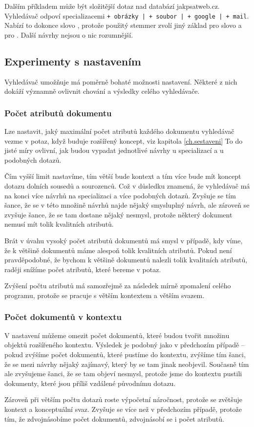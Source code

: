 \documentclass[12pt]{article}
\newcommand{\code}[1]{\texttt{#1}}
\newcommand{\ssection}[1]{\subsection{#1}}
\newcommand{\sssection}[1]{\subsubsection{#1}}
\begin{document}
Dalším příkladem může být složitější dotaz  nad databází jakpsatweb.cz. Vyhledávač odpoví specializacemi \code{+ obrázky | + soubor | + google | + mail}. Nabízí to dokonce slovo , protože použitý stemmer zvolí jiný základ pro slovo  a pro . Další návrhy nejsou o nic rozumnější. 


\ssection{Experimenty s nastavením}
Vyhledávač umožňuje má poměrně bohaté možnosti nastavení. Některé z nich dokáží významně ovlivnit chování a výsledky celého vyhledávače. 

\sssection{Počet atributů dokumentu}
Lze nastavit, jaký maximální počet atributů každého dokumentu vyhledávač vezme v potaz, když buduje rozšířený koncept, viz kapitola \ref{ch.sestaveni} To do jisté míry ovlivní, jak budou vypadat jednotlivé návrhy u specializací a u podobných dotazů. 

Čím vyšší limit nastavíme, tím větší bude kontext a tím více bude mít koncept dotazu dolních sousedů a sourozenců. Což v důsledku znamená, že vyhledávač má na konci více návrhů na specializaci a více podobných dotazů. Zvyšuje se tím šance, že se v této množině návrhů najde nějaký smysluplný návrh, ale zároveň se zvyšuje šance, že se tam dostane nějaký nesmysl, protože některý dokument nemusí mít tolik kvalitních atributů. 

Brát v úvahu vysoký počet atributů dokumentů má smysl v případě, kdy víme, že k většině dokumentů máme alespoň tolik kvalitních atributů. Pokud není pravděpodobné, že bychom k většině dokumentů nalezli tolik kvalitních atributů, raději snížíme počet atributů, které bereme v potaz. 

Zvýšení počtu atributů má samozřejmě za následek mírně zpomalení celého programu, protože se pracuje s větším kontextem a větším svazem. 

\sssection{Počet dokumentů v kontextu}
V nastavení můžeme omezit počet dokumentů, které budou tvořit množinu objektů rozšířeného kontextu. Výsledek je podobný jako v předchozím případě -- pokud zvýšíme počet dokumentů, které pustíme do kontextu, zvýšíme tím šanci, že se mezi návrhy nějaký zajímavý, který by se tam jinak neobjevil. Současně tím ale zvyšujeme šanci, že se tam objeví nesmysl, protože jsme do kontextu pustili dokumenty, které jsou příliš vzdálené původnímu dotazu.

Zároveň při větším počtu dotazů roste výpočetní náročnost, protože se zvětšuje kontext a konceptuální svaz. Zvyšuje se více než v předchozím případě, protože tím, že zdvojnásobíme počet dokumentů, zdvojnásobí se i počet atributů. 
\end{document}
